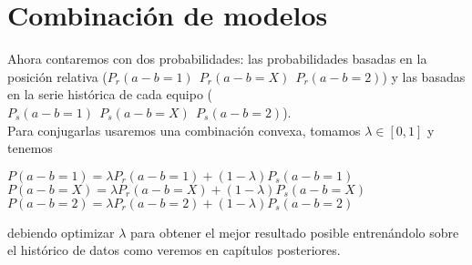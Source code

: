\section{Combinación de modelos}
Ahora contaremos con dos probabilidades: las probabilidades basadas en la posición relativa ($P_{r}(a-b=1) \ \ P_{r}(a-b=X) \ \ P_{r}(a-b=2)$) y las basadas en la serie histórica de cada equipo ($P_{s}(a-b=1) \ \ P_{s}(a-b=X) \ \ P_{s}(a-b=2)$).\\

Para conjugarlas usaremos una combinación convexa, tomamos $\lambda \in [0,1]$ y tenemos
\begin{center}
	$ P(a-b=1) = \lambda P_{r}(a-b=1) + (1-\lambda) P_{s}(a-b=1)$\\
	$ P(a-b=X) = \lambda P_{r}(a-b=X) + (1-\lambda) P_{s}(a-b=X)$\\
	$ P(a-b=2) = \lambda P_{r}(a-b=2) + (1-\lambda) P_{s}(a-b=2)$
\end{center}
debiendo optimizar $\lambda$ para obtener el mejor resultado posible entrenándolo sobre el histórico de datos como veremos en capítulos posteriores.